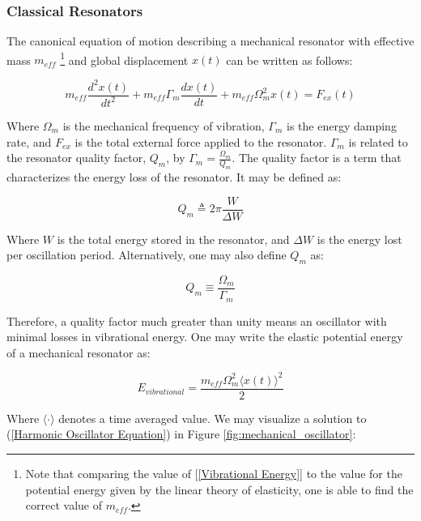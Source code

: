 \documentclass[%
 reprint,
nofootinbib,
 amsmath,amssymb,
 aps,
]{revtex4-2}
\begin{document}
\subsubsection{Classical Resonators}

The canonical equation of motion describing a mechanical resonator with effective mass  $m_{eff}$ \footnote{Note that comparing the value of [\ref{Vibrational Energy}] to the value for the potential energy given by the linear theory of elasticity, one is able to find the correct value of $m_{eff}$.} and global displacement $x(t)$ can be written as follows:

\begin{equation} \label{Harmonic Oscillator Equation}
    m_{eff}\frac{d^2 x(t)}{dt^2} + m_{eff}\Gamma_{m}\frac{dx(t)}{dt} + m_{eff}\Omega_{m}^2 x(t) = F_{ex}(t)
\end{equation}

Where $\Omega_{m}$ is the mechanical frequency of vibration, $\Gamma_{m}$ is the energy damping rate, and $F_{ex}$ is the total external force applied to the resonator. $\Gamma_{m}$ is related to the resonator quality factor, $Q_{m}$, by $\Gamma_{m} = \frac{\Omega_{m}}{Q_{m}}$. The quality factor is a term that characterizes the energy loss of the resonator. It may be defined as:

$$Q_{m} \triangleq 2\pi \frac{W}{\Delta W}$$

Where $W$ is the total energy stored in the resonator, and $\Delta W$ is the energy lost per oscillation period. Alternatively, one may also define $Q_{m}$ as:

$$ Q_{m} \equiv \frac{\Omega_{m}}{\Gamma_{m}} $$

Therefore, a quality factor much greater than unity means an oscillator with minimal losses in vibrational energy. One may write the elastic potential energy of a mechanical resonator as:

\begin{equation} \label{Vibrational Energy}
    E_{vibrational} = \frac{m_{eff}\Omega_{m}^2 \big \langle x(t) \big \rangle ^2}{2}
\end{equation}

Where $\big \langle \boldsymbol{\cdot} \big \rangle $ denotes a time averaged value. We may visualize a solution to (\ref{Harmonic Oscillator Equation}) in Figure \ref{fig:mechanical_oscillator}:
\end{document}
